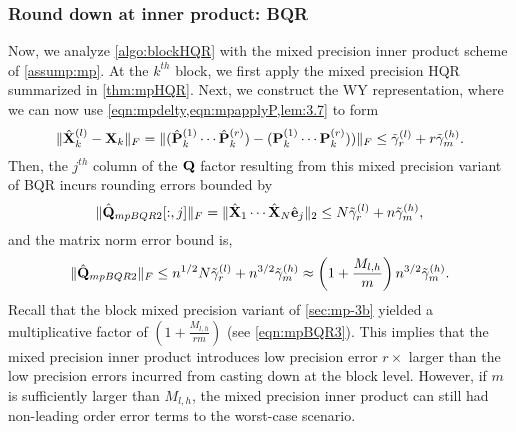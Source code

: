 \subsubsection{Round down at inner product: BQR}
Now, we analyze \cref{algo:blockHQR} with the mixed precision inner product scheme of \cref{assump:mp}. 
At the $k^{th}$ block, we first apply the mixed precision HQR summarized in \cref{thm:mpHQR}.
Next, we construct the WY representation, where we can now use \cref{eqn:mpdelty,eqn:mpapplyP,lem:3.7} to form
\begin{equation}
	\|\hat{\mathbf{X}}_{k}^{(l)}- \mathbf{X}_k\|_F = \|(\hat{\mathbf{P}}_k^{(1)}\cdots \hat{\mathbf{P}}_k^{(r)})-(\mathbf{P}_k^{(1)}\cdots \mathbf{P}_k^{(r)}))\|_F \leq \tilde{\gamma}_{r}^{(l)} + r\tilde{\gamma}_{m}^{(h)}.
\end{equation}
Then, the $j^{th}$ column of the $\mathbf{Q}$ factor resulting from this mixed precision variant of BQR incurs rounding errors bounded by
\begin{equation}
	\|\hat{\mathbf{Q}}_{mpBQR2}[:,j]\|_F = \|\hat{\mathbf{X}}_1\cdots\hat{\mathbf{X}}_N\hat{\mathbf{e}}_j\|_2\leq N\tilde{\gamma}_{r}^{(l)} + n\tilde{\gamma}_{m}^{(h)},
\end{equation}
and the matrix norm error bound is, 
\begin{equation}
	\|\hat{\bb{Q}}_{mpBQR2}\|_F \leq n^{1/2}N\tilde{\gamma}_{r}^{(l)} + n^{3/2}\tilde{\gamma}_{m}^{(h)} \approx \left(1+\frac{M_{l,h}}{m}\right)n^{3/2}\tilde{\gamma}_{m}^{(h)}. \label{eqn:mpBQR2}
\end{equation}
Recall that the block mixed precision variant of \cref{sec:mp-3b} yielded a multiplicative factor of $(1+\frac{M_{l,h}}{rm})$ (see \cref{eqn:mpBQR3}).
This implies that the mixed precision inner product introduces low precision error $r\times $ larger than the low precision errors incurred from casting down at the block level.
However, if $m$ is sufficiently larger than $M_{l,h}$, the mixed precision inner product can still had non-leading order error terms to the worst-case scenario.
